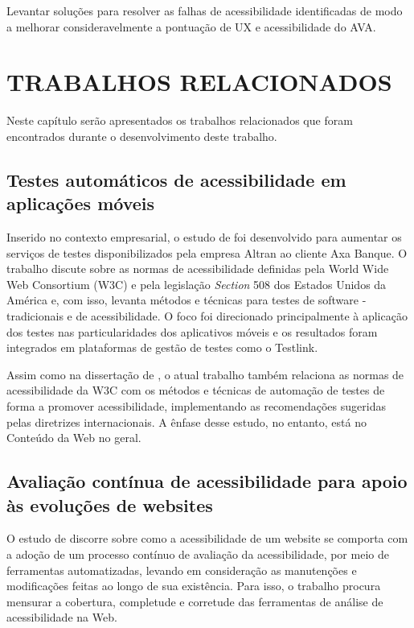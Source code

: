 \documentclass[
	12pt,				%
	openright,			%
	oneside,			%
	a4paper,			%
	chapter=TITLE,		%
	section=TITLE,		%
	subsection=TITLE,	%
	subsubsection=TITLE,%
	english,			%
	brazil				%
	]{abntex2}
\theoremstyle{definition}
\begin{document}
Levantar soluções para resolver as falhas de acessibilidade identificadas de modo a melhorar consideravelmente a pontuação de UX e acessibilidade do AVA.
    


\chapter{TRABALHOS RELACIONADOS}

Neste capítulo serão apresentados os trabalhos relacionados que foram encontrados durante o desenvolvimento deste trabalho.

\section{Testes automáticos de acessibilidade em aplicações móveis} 

Inserido no contexto empresarial, o estudo de \cite{chantre2015testes} foi desenvolvido para aumentar os serviços de testes disponibilizados pela empresa Altran ao cliente Axa Banque. O trabalho discute sobre as normas de acessibilidade definidas pela World Wide Web Consortium (W3C) e pela legislação \textit{Section} 508 dos Estados Unidos da América e, com isso, levanta métodos e técnicas para testes de software - tradicionais e de acessibilidade. O foco foi direcionado principalmente à aplicação dos testes nas particularidades dos aplicativos móveis e os resultados foram integrados em plataformas de gestão de testes como o Testlink.

Assim como na dissertação de \cite{chantre2015testes}, o atual trabalho também relaciona as normas de acessibilidade da W3C com os métodos e técnicas de automação de testes de forma a promover acessibilidade, implementando as recomendações sugeridas pelas diretrizes internacionais. A ênfase desse estudo, no entanto, está no Conteúdo da Web no geral.

\section{Avaliação contínua de acessibilidade para apoio às evoluções de websites} 

O estudo de \cite{silva2017avaliaccao} discorre sobre como a acessibilidade de um website se comporta com a adoção de um processo contínuo de avaliação da acessibilidade, por meio de ferramentas automatizadas, levando em consideração as manutenções e modificações feitas ao longo de sua existência. Para isso, o trabalho procura mensurar a cobertura, completude e corretude das ferramentas de análise de acessibilidade na Web.
\end{document}
